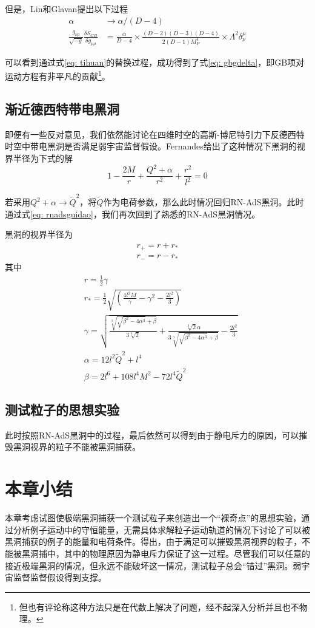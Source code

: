 但是，Lin和Glavan提出以下过程
\begin{align}
    \alpha&\rightarrow \alpha/\left(D-4\right) \label{eq: tihuan} \\
    \frac{g_{\nu \rho}}{\sqrt{-g}}\frac{\delta S_{GB}}{\delta g_{\mu \rho}}&=\frac{\alpha}{D-4} \times \frac{\left(D-2\right)\left(D-3\right)\left(D-4\right)}{2\left(D-1\right)M_P^4}\times \Lambda^2 \delta^\mu_\nu \label{eq: gbgdelta}
\end{align}

可以看到通过式\eqref{eq: tihuan}的替换过程，成功得到了式\eqref{eq: gbgdelta}，即GB项对运动方程有非平凡的贡献\footnote{但也有评论称这种方法只是在代数上解决了问题，经不起深入分析并且也不物理。}。
\subsection{渐近德西特带电黑洞}
即便有一些反对意见，我们依然能讨论在四维时空的高斯-博尼特引力下反德西特时空中带电黑洞是否满足弱宇宙监督假设。Fernandes给出了这种情况下黑洞的视界半径为下式的解\citep{fernandes2020charged}
\begin{equation}\label{eq: gbadsrfun}
    1-\frac{2M}{r}+\frac{Q^2+\alpha}{r^2}+\frac{r^2}{l^2}=0
\end{equation}

若采用$Q^2+\alpha \rightarrow \tilde{Q}^2 $，将$\tilde{Q}$作为电荷参数，那么此时情况回归RN-AdS黑洞。此时通过式\eqref{eq: rnadsguidao}，我们再次回到了熟悉的RN-AdS黑洞情况。

黑洞的视界半径为
\begin{align}
    r_+=r + r_* \label{eq: egbr+} \\
    r_-=r-r_* \label{eq: egbr-} 
\end{align}
其中
\begin{align*}
    &r = \frac{1}{2} \gamma \\
    &r_* = \frac{1}{2} \sqrt{(\frac{4 l^2
    M}{\gamma}-\gamma^2-\frac{2 l^2}{3})}  \\
    &\gamma = \sqrt{\frac{\sqrt[3]{\sqrt{\beta^2-4 \alpha^3}+\beta}}{3\sqrt[3]{2}}+\frac{\sqrt[3]{2} \alpha}{3 \sqrt[3]{\sqrt{\beta^2-4\alpha^3}+\beta}}-\frac{2 l^2}{3}} \\
    &\alpha =12 l^2 \tilde{Q}^2+l^4 \\ 
    &\beta =2 l^6 + 108 l^4 M^2 - 72 l^4 \tilde{Q}^2 
\end{align*}

\subsection{测试粒子的思想实验}
此时按照RN-AdS黑洞中的过程，最后依然可以得到由于静电斥力的原因，可以摧毁黑洞视界的粒子不能被黑洞捕获。

\section{本章小结}
本章考虑试图使极端黑洞捕获一个测试粒子来创造出一个“裸奇点”的思想实验，通过分析例子运动中的守恒能量，无需具体求解粒子运动轨道的情况下讨论了可以被黑洞捕获的例子的能量和电荷条件。得出，由于满足可以摧毁黑洞视界的粒子，不能被黑洞捕中，其中的物理原因为静电斥力保证了这一过程。尽管我们可以任意的接近极端黑洞的情况，但永远不能破坏这一情况，测试粒子总会“错过”黑洞。弱宇宙监督监督假设得到支撑。


